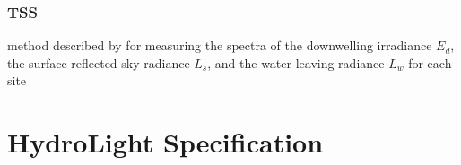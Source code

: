 \begin{appendices}
\subsection{TSS}



method described by \cite{Mobley:1999} for measuring the spectra of the downwelling irradiance $E_d$, the surface reflected sky radiance $L_s$, and the water-leaving radiance $L_w$ for each site 
\chapter{HydroLight Specification}

\end{appendices}